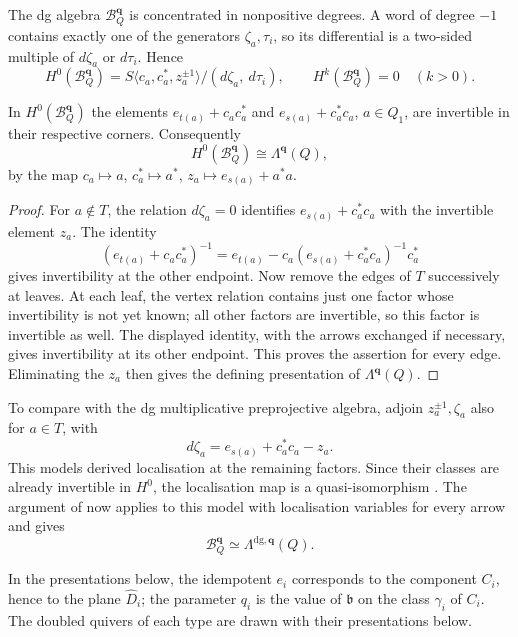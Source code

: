 \documentclass[a4paper]{amsart}
\numberwithin{equation}{section}
\begin{document}
The dg algebra $\mathcal B_Q^{\boldsymbol q}$ is concentrated in
nonpositive degrees. A word of degree $-1$ contains exactly one of the
generators $\zeta_a,\tau_i$, so its differential is a two-sided multiple
of $d\zeta_a$ or $d\tau_i$. Hence
\[
 H^0(\mathcal B_Q^{\boldsymbol q})
 =S\langle c_a,c_a^*,z_a^{\pm1}\rangle/(d\zeta_a,\ d\tau_i),
 \qquad H^k(\mathcal B_Q^{\boldsymbol q})=0\quad(k>0).
\]

\begin{lemma}\label{lem:factors-invertible}
In $H^0(\mathcal B_Q^{\boldsymbol q})$ the elements
$e_{t(a)}+c_ac_a^*$ and $e_{s(a)}+c_a^*c_a$, $a\in Q_1$, are
invertible in their respective corners. Consequently
\[
 H^0(\mathcal B_Q^{\boldsymbol q})\cong\Lambda^{\boldsymbol q}(Q),
\]
by the map $c_a\mapsto a$, $c_a^*\mapsto a^*$, $z_a\mapsto e_{s(a)}+a^*a$.
\end{lemma}

\begin{proof}
For $a\notin T$, the relation $d\zeta_a=0$ identifies
$e_{s(a)}+c_a^*c_a$ with the invertible element $z_a$. The identity
\[
 (e_{t(a)}+c_ac_a^*)^{-1}
 =e_{t(a)}-c_a(e_{s(a)}+c_a^*c_a)^{-1}c_a^*
\]
gives invertibility at the other endpoint. Now remove the edges of
$T$ successively at leaves. At each leaf, the vertex relation contains
just one factor whose invertibility is not yet known; all other
factors are invertible, so this factor is invertible as well. The
displayed identity, with the arrows exchanged if necessary, gives
invertibility at its other endpoint. This proves the assertion for
every edge. Eliminating the $z_a$ then gives the defining presentation
of $\Lambda^{\boldsymbol q}(Q)$.
\end{proof}

To compare with the dg multiplicative preprojective algebra, adjoin
$z_a^{\pm1},\zeta_a$ also for $a\in T$, with
\[
 d\zeta_a=e_{s(a)}+c_a^*c_a-z_a.
\]
This models derived localisation at the remaining factors. Since
their classes are already invertible in $H^0$, the localisation map
is a quasi-isomorphism \cite[Section~3]{BCL18}. The argument of
\cite[Remark~4.7]{KS} now applies to this model with localisation
variables for every arrow and gives
\[
 \mathcal B_Q^{\boldsymbol q}\simeq
 \Lambda^{\mathrm{dg},\boldsymbol q}(Q).
\]

In the presentations below, the idempotent $e_i$ corresponds to the
component $C_i$, hence to the plane $\widehat D_i$; the parameter $q_i$
is the value of $\mathfrak{b}$ on the class $\gamma_i$ of $C_i$.
The doubled quivers of each type are drawn with their presentations
below.
\end{document}
